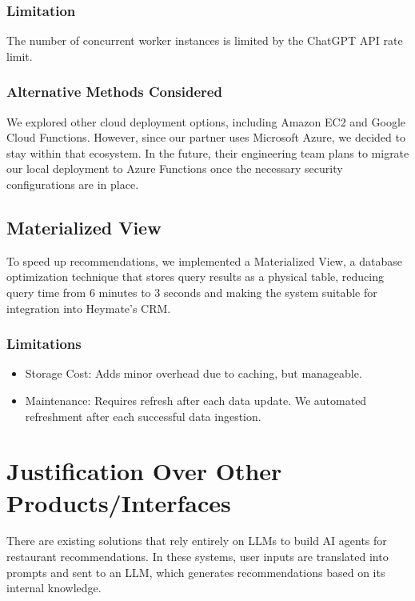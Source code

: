 \documentclass[
  11pt,
  a4paper,
  DIV=11,
  numbers=noendperiod]{scrartcl}
\providecommand{\tightlist}{%
  \setlength{\itemsep}{0pt}\setlength{\parskip}{0pt}}\usepackage{longtable,booktabs,array}
\begin{document}
\subsubsection{Limitation}\label{limitation-1}

The number of concurrent worker instances is limited by the ChatGPT API
rate limit.

\subsubsection{Alternative Methods
Considered}\label{alternative-methods-considered-1}

We explored other cloud deployment options, including Amazon EC2 and
Google Cloud Functions. However, since our partner uses Microsoft Azure,
we decided to stay within that ecosystem. In the future, their
engineering team plans to migrate our local deployment to Azure
Functions once the necessary security configurations are in place.

\subsection{Materialized View}\label{materialized-view}

To speed up recommendations, we implemented a Materialized View, a
database optimization technique that stores query results as a physical
table, reducing query time from 6 minutes to 3 seconds and making the
system suitable for integration into Heymate's CRM.

\subsubsection{Limitations}\label{limitations}

\begin{itemize}
\tightlist
\item
  Storage Cost: Adds minor overhead due to caching, but manageable.
\item
  Maintenance: Requires refresh after each data update. We automated
  refreshment after each successful data ingestion.
\end{itemize}

\section{Justification Over Other
Products/Interfaces}\label{justification-over-other-productsinterfaces}

There are existing solutions that rely entirely on LLMs to build AI
agents for restaurant recommendations. In these systems, user inputs are
translated into prompts and sent to an LLM, which generates
recommendations based on its internal knowledge.
\end{document}
